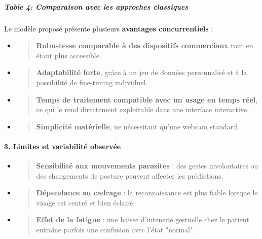 \documentclass[
]{article}
\begin{document}
\hypertarget{table-4-comparaison-avec-les-approches-classiques}{%
\subparagraph{Table 4: Comparaison avec les approches classiques}\label{table-4-comparaison-avec-les-approches-classiques}}

Le modèle proposé présente plusieurs \textbf{avantages concurrentiels} :

\begin{itemize}
\item
  \begin{quote}
  \textbf{Robustesse comparable à des dispositifs commerciaux} tout en étant plus accessible.
  \end{quote}
\item
  \begin{quote}
  \textbf{Adaptabilité forte}, grâce à un jeu de données personnalisé et à la possibilité de fine-tuning individuel.
  \end{quote}
\item
  \begin{quote}
  \textbf{Temps de traitement compatible avec un usage en temps réel}, ce qui le rend directement exploitable dans une interface interactive.
  \end{quote}
\item
  \begin{quote}
  \textbf{Simplicité matérielle}, ne nécessitant qu'une webcam standard.
  \end{quote}
\end{itemize}

\hypertarget{limites-et-variabilituxe9-observuxe9e}{%
\paragraph{\texorpdfstring{\textbf{3. Limites et variabilité observée}}{3. Limites et variabilité observée}}\label{limites-et-variabilituxe9-observuxe9e}}

\begin{itemize}
\item
  \begin{quote}
  \textbf{Sensibilité aux mouvements parasites} : des gestes involontaires ou des changements de posture peuvent affecter les prédictions.
  \end{quote}
\item
  \begin{quote}
  \textbf{Dépendance au cadrage} : la reconnaissance est plus fiable lorsque le visage est centré et bien éclairé.
  \end{quote}
\item
  \begin{quote}
  \textbf{Effet de la fatigue} : une baisse d'intensité gestuelle chez le patient entraîne parfois une confusion avec l'état "normal".
  \end{quote}
\end{itemize}
\end{document}

